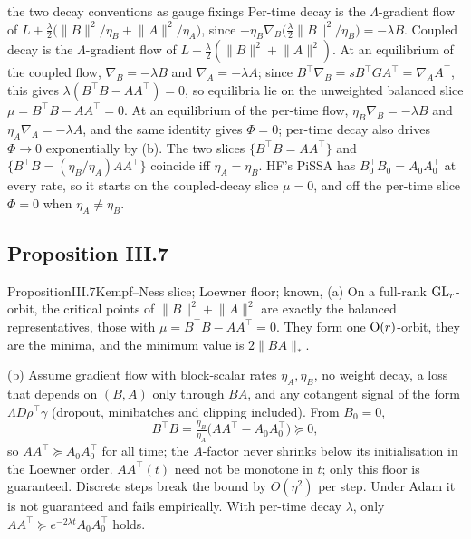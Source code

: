 \begin{remark*}{the two decay conventions as gauge fixings}
Per-time decay is the $\Lambda$-gradient flow of $L+\tfrac\lambda2\big(\lVert B\rVert^2/\eta_B+\lVert A\rVert^2/\eta_A\big)$,
since $-\eta_B\nabla_B\big(\tfrac\lambda2\lVert B\rVert^2/\eta_B\big)=-\lambda B$. Coupled decay is the $\Lambda$-gradient
flow of $L+\tfrac\lambda2(\lVert B\rVert^2+\lVert A\rVert^2)$. At an equilibrium of the coupled flow,
$\nabla_B=-\lambda B$ and $\nabla_A=-\lambda A$; since $B^\top\nabla_B=sB^\top GA^\top=\nabla_AA^\top$, this gives
$\lambda(B^\top B-AA^\top)=0$, so equilibria lie on the unweighted balanced slice $\mu=B^\top B-AA^\top=0$. At an
equilibrium of the per-time flow, $\eta_B\nabla_B=-\lambda B$ and $\eta_A\nabla_A=-\lambda A$, and the same identity gives
$\Phi=0$; per-time decay also drives $\Phi\to0$ exponentially by (b). The two slices
$\{B^\top B=AA^\top\}$ and $\{B^\top B=(\eta_B/\eta_A)AA^\top\}$ coincide iff $\eta_A=\eta_B$. HF's PiSSA has
$B_0^\top B_0=A_0A_0^\top$ at every rate, so it starts on the coupled-decay slice $\mu=0$, and off the per-time slice
$\Phi=0$ when $\eta_A\ne\eta_B$.
\end{remark*}

\subsection{Proposition III.7}\label{proof:III.7}

\begin{restate}{Proposition}{III.7}{Kempf--Ness slice; Loewner floor; known, \citet{xkempf1979length,xsrebro2004maximum}}
(a) On a full-rank $\mathrm{GL}_r$-orbit, the critical points of $\lVert B\rVert^2+\lVert A\rVert^2$ are exactly the balanced
representatives, those with $\mu=B^\top B-AA^\top=0$. They form one $\mathrm{O}(r)$-orbit, they are the minima, and the minimum
value is $2\lVert BA\rVert_*$.

(b) Assume gradient flow with block-scalar rates $\eta_A,\eta_B$, no weight decay, a loss that depends on $(B,A)$ only
through $BA$, and any cotangent signal of the form $\Lambda D\rho^\top\gamma$ (dropout, minibatches and clipping
included). From $B_0=0$,
\[B^\top B=\tfrac{\eta_B}{\eta_A}\big(AA^\top-A_0A_0^\top\big)\succeq0,\]
so $AA^\top\succeq A_0A_0^\top$ for all time; the $A$-factor never shrinks below its initialisation in the Loewner order.
$AA^\top(t)$ need not be monotone in $t$; only this floor is guaranteed. Discrete steps break the bound by $O(\eta^2)$ per
step. Under Adam it is not guaranteed and fails empirically. With per-time decay $\lambda$, only
$AA^\top\succeq e^{-2\lambda t}A_0A_0^\top$ holds.
\end{restate}

